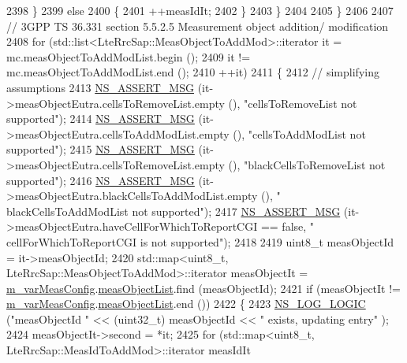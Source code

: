 \begin{DoxyCode}
2398             \}
2399           \textcolor{keywordflow}{else}
2400             \{
2401               ++measIdIt;
2402             \}
2403         \}
2404 
2405     \}
2406 
2407   \textcolor{comment}{// 3GPP TS 36.331 section 5.5.2.5  Measurement object addition/ modification}
2408   \textcolor{keywordflow}{for} (std::list<LteRrcSap::MeasObjectToAddMod>::iterator it = mc.measObjectToAddModList.begin ();
2409        it !=  mc.measObjectToAddModList.end ();
2410        ++it)
2411     \{
2412       \textcolor{comment}{// simplifying assumptions}
2413       \hyperlink{assert_8h_aff5ece9066c74e681e74999856f08539}{NS\_ASSERT\_MSG} (it->measObjectEutra.cellsToRemoveList.empty (), \textcolor{stringliteral}{"cellsToRemoveList not
       supported"});
2414       \hyperlink{assert_8h_aff5ece9066c74e681e74999856f08539}{NS\_ASSERT\_MSG} (it->measObjectEutra.cellsToAddModList.empty (), \textcolor{stringliteral}{"cellsToAddModList not
       supported"});
2415       \hyperlink{assert_8h_aff5ece9066c74e681e74999856f08539}{NS\_ASSERT\_MSG} (it->measObjectEutra.cellsToRemoveList.empty (), \textcolor{stringliteral}{"blackCellsToRemoveList
       not supported"});
2416       \hyperlink{assert_8h_aff5ece9066c74e681e74999856f08539}{NS\_ASSERT\_MSG} (it->measObjectEutra.blackCellsToAddModList.empty (), \textcolor{stringliteral}{"
      blackCellsToAddModList not supported"});
2417       \hyperlink{assert_8h_aff5ece9066c74e681e74999856f08539}{NS\_ASSERT\_MSG} (it->measObjectEutra.haveCellForWhichToReportCGI == \textcolor{keyword}{false}, \textcolor{stringliteral}{"
      cellForWhichToReportCGI is not supported"});
2418 
2419       uint8\_t measObjectId = it->measObjectId;
2420       std::map<uint8\_t, LteRrcSap::MeasObjectToAddMod>::iterator measObjectIt = 
      \hyperlink{classns3_1_1LteUeRrc_a27a7773eedfdab964d2514d9eeb1c562}{m\_varMeasConfig}.\hyperlink{structns3_1_1LteUeRrc_1_1VarMeasConfig_a79928885aabfe13a4d88e5d31233fac3}{measObjectList}.find (measObjectId);
2421       \textcolor{keywordflow}{if} (measObjectIt != \hyperlink{classns3_1_1LteUeRrc_a27a7773eedfdab964d2514d9eeb1c562}{m\_varMeasConfig}.\hyperlink{structns3_1_1LteUeRrc_1_1VarMeasConfig_a79928885aabfe13a4d88e5d31233fac3}{measObjectList}.end ())
2422         \{
2423           \hyperlink{group__logging_ga88acd260151caf2db9c0fc84997f45ce}{NS\_LOG\_LOGIC} (\textcolor{stringliteral}{"measObjectId "} << (uint32\_t) measObjectId << \textcolor{stringliteral}{" exists, updating entry"}
      );
2424           measObjectIt->second = *it;
2425           \textcolor{keywordflow}{for} (std::map<uint8\_t, LteRrcSap::MeasIdToAddMod>::iterator measIdIt 

\end{DoxyCode}
